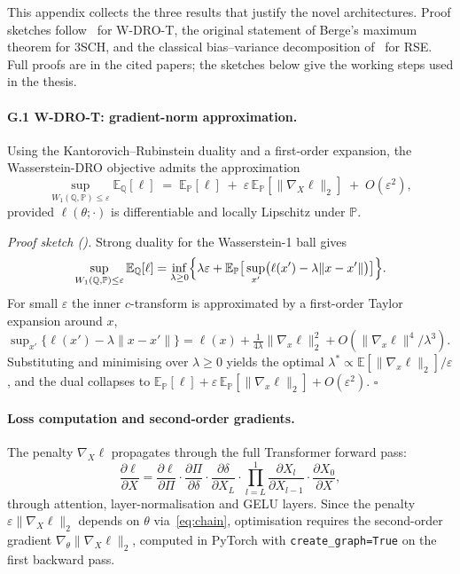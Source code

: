 \documentclass[11pt,oneside]{report}
\newcommand{\PP}{\mathbb{P}}
\newcommand{\QQ}{\mathbb{Q}}
\newcommand{\E}{\mathbb{E}}
\begin{document}
This appendix collects the three results that justify the novel architectures.  Proof sketches follow~\citet{blanchet2019quantifying,esfahani2018data} for W-DRO-T, the original statement of Berge's maximum theorem for 3SCH, and the classical bias--variance decomposition of~\citet{dietterich2000ensemble} for RSE.  Full proofs are in the cited papers; the sketches below give the working steps used in the thesis.

\paragraph{G.1 \quad W-DRO-T: gradient-norm approximation.}
Using the Kantorovich--Rubinstein duality and a first-order expansion, the Wasserstein-DRO objective admits the approximation
\begin{equation}
\sup_{W_1(\QQ,\PP)\le\varepsilon}\E_\QQ[\ell]
\;=\;
\E_\PP[\ell]
\;+\;
\varepsilon\,\E_\PP[\|\nabla_X \ell\|_2]
\;+\;O(\varepsilon^2),
\tag{W-DRO-T.1}
\end{equation}
provided $\ell(\theta;\cdot)$ is differentiable and locally Lipschitz under $\PP$.

\smallskip
\noindent\textit{Proof sketch (\citealp{blanchet2019quantifying}).}  Strong duality for the Wasserstein-1 ball gives
\[
\sup_{W_1(\QQ,\PP)\le\varepsilon}\E_\QQ[\ell]
=
\inf_{\lambda\ge0}\Bigl\{\lambda\varepsilon + \E_\PP\bigl[\,\sup_{x'}\bigl(\ell(x')-\lambda\|x-x'\|\bigr)\bigr]\Bigr\}.
\]
For small $\varepsilon$ the inner $c$-transform is approximated by a first-order Taylor expansion around $x$,
$\sup_{x'}\{\ell(x')-\lambda\|x-x'\|\} = \ell(x) + \tfrac{1}{4\lambda}\|\nabla_x\ell\|_2^2 + O(\|\nabla_x\ell\|^4/\lambda^3)$.
Substituting and minimising over $\lambda\ge 0$ yields the optimal $\lambda^*\propto\E[\|\nabla_x\ell\|_2]/\varepsilon$, and the dual collapses to $\E_\PP[\ell] + \varepsilon\,\E_\PP[\|\nabla_x\ell\|_2] + O(\varepsilon^2)$. \hfill$\square$

\paragraph{Loss computation and second-order gradients.}
The penalty $\nabla_X\ell$ propagates through the full Transformer forward pass:
\begin{equation}
\frac{\partial \ell}{\partial X}
=
\frac{\partial \ell}{\partial \Pi}\cdot\frac{\partial \Pi}{\partial \delta}\cdot\frac{\partial \delta}{\partial X_L}\cdot\prod_{l=L}^{1}\frac{\partial X_l}{\partial X_{l-1}}\cdot\frac{\partial X_0}{\partial X},
\label{eq:chain}
\end{equation}
through attention, layer-normalisation and GELU layers.  Since the penalty $\varepsilon\|\nabla_X\ell\|_2$ depends on $\theta$ via~\eqref{eq:chain}, optimisation requires the second-order gradient $\nabla_\theta\|\nabla_X\ell\|_2$, computed in PyTorch with \texttt{create\_graph=True} on the first backward pass.
\end{document}
